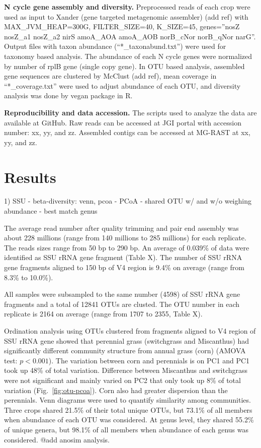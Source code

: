 \documentclass[12pt]{article}
\begin{document}
{\bf N cycle gene assembly and diversity.}
Preprocessed reads of each crop were used as input to Xander (gene targeted metagenomic assembler) (add ref) with MAX\_JVM\_HEAP=300G, FILTER\_SIZE=40, K\_SIZE=45, genes=''nosZ nosZ\_a1 nosZ\_a2 nirS amoA\_AOA amoA\_AOB norB\_cNor norB\_qNor narG''. Output files with taxon abundance (``*\_taxonabund.txt'') were used for taxonomy based analysis. The abundance of each N cycle genes were normalized by number of rplB gene (single copy gene). In OTU based analysis, assembled gene sequences are clustered by McClust (add ref), mean coverage in ``*\_coverage.txt'' were used to adjust abundance of each OTU, and diversity analysis was done by vegan package in R.

{\bf Reproducibility and data accession.}
The scripts used to analyze the data are available at GitHub. Raw reads can be accessed at JGI portal with accession number: xx, yy, and zz. Assembled contigs can be accessed at MG-RAST at xx, yy, and zz.

\section{Results}

1) SSU
- beta-diversity: venn, pcoa
  - PCoA
  - shared OTU w/ and w/o weighing abundance
  - best match genus

The average read number after quality trimming and pair end assembly was about 228 millions (range from 140 millions to 285 millions) for each replicate. The reads sizes range from 50 bp to 290 bp. An average of 0.039\% of data were identified as SSU rRNA gene fragment (Table X). The number of SSU rRNA gene fragments aligned to 150 bp of V4 region is 9.4\% on average (range from 8.3\% to 10.0\%).

All samples were subsampled to the same number (4598) of SSU rRNA gene fragments and a total of 12841 OTUs are clusted. The OTU number in each replicate is 2164 on average (range from 1707 to 2355, Table X).

Ordination analysis using OTUs clustered from fragments aligned to V4 region of SSU rRNA gene showed that perennial grass (switchgrass and Miscanthus) had significantly different community structure from annual grass (corn) (AMOVA test: $p < 0.001$). The variation between corn and perennials is on PC1 and PC1 took up 48\% of total variation. Difference between Miscanthus and switchgrass were not significant and mainly varied on PC2 that only took up 8\% of total variation (Fig.~\ref{fig:otu-pcoa}). Corn also had greater dispersion than the perennials. Venn diagrams were used to quantify similarity among communities. Three crops shared 21.5\% of their total unique OTUs, but 73.1\% of all members when abundance of each OTU was considered. At genus level, they shared 55.2\% of unique genera, but 98.1\% of all members when abundance of each genus was considered. @add anosim analysis.
\end{document}
